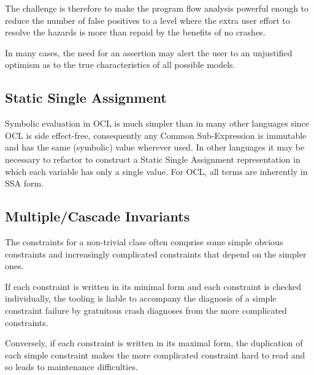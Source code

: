 \documentclass[
]{ceurart}
\begin{document}
The challenge is therefore to make the program flow analysis powerful enough to reduce the number of false positives to a level where the extra user effort to resolve the hazards is more than repaid by the benefits of no crashes. %

In many cases, the need for an assertion may alert the user to an unjustified optimism as to the true characteristics of all possible models.

\subsection{Static Single Assignment}

Symbolic evaluation in OCL is much simpler than in many other languages since OCL is side effect-free, consequently any Common Sub-Expression \cite{DragonBook} is immutable and has the same (symbolic) value wherever used. In other languages it may be necessary to refactor to construct a Static Single Assignment representation in which each variable has only a single value. For OCL, all terms are inherently in SSA form.

\subsection{Multiple/Cascade Invariants}

The constraints for a non-trivial class often comprise some simple obvious constraints and increasingly complicated constraints that depend on the simpler ones.

If each constraint is written in its minimal form and each constraint is checked individually, the tooling is liable to accompany the diagnosis of a simple constraint failure by gratuitous crash diagnoses from the more complicated constraints.

Conversely, if each constraint is written in its maximal form, the duplication of each simple constraint makes the more complicated constraint hard to read and so leads to maintenance difficulties.

\end{document}
